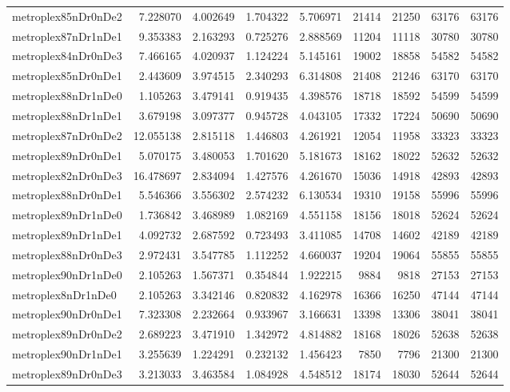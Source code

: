 \begin{longtable}{|l|r|r|r|r|r|r|r|r|}
metroplex85nDr0nDe2 & 7.228070 & 4.002649 & 1.704322 & 5.706971 & 21414 & 21250 & 63176 & 63176 \\
metroplex87nDr1nDe1 & 9.353383 & 2.163293 & 0.725276 & 2.888569 & 11204 & 11118 & 30780 & 30780 \\
metroplex84nDr0nDe3 & 7.466165 & 4.020937 & 1.124224 & 5.145161 & 19002 & 18858 & 54582 & 54582 \\
metroplex85nDr0nDe1 & 2.443609 & 3.974515 & 2.340293 & 6.314808 & 21408 & 21246 & 63170 & 63170 \\
metroplex88nDr1nDe0 & 1.105263 & 3.479141 & 0.919435 & 4.398576 & 18718 & 18592 & 54599 & 54599 \\
metroplex88nDr1nDe1 & 3.679198 & 3.097377 & 0.945728 & 4.043105 & 17332 & 17224 & 50690 & 50690 \\
metroplex87nDr0nDe2 & 12.055138 & 2.815118 & 1.446803 & 4.261921 & 12054 & 11958 & 33323 & 33323 \\
metroplex89nDr0nDe1 & 5.070175 & 3.480053 & 1.701620 & 5.181673 & 18162 & 18022 & 52632 & 52632 \\
metroplex82nDr0nDe3 & 16.478697 & 2.834094 & 1.427576 & 4.261670 & 15036 & 14918 & 42893 & 42893 \\
metroplex88nDr0nDe1 & 5.546366 & 3.556302 & 2.574232 & 6.130534 & 19310 & 19158 & 55996 & 55996 \\
metroplex89nDr1nDe0 & 1.736842 & 3.468989 & 1.082169 & 4.551158 & 18156 & 18018 & 52624 & 52624 \\
metroplex89nDr1nDe1 & 4.092732 & 2.687592 & 0.723493 & 3.411085 & 14708 & 14602 & 42189 & 42189 \\
metroplex88nDr0nDe3 & 2.972431 & 3.547785 & 1.112252 & 4.660037 & 19204 & 19064 & 55855 & 55855 \\
metroplex90nDr1nDe0 & 2.105263 & 1.567371 & 0.354844 & 1.922215 & 9884 & 9818 & 27153 & 27153 \\
metroplex8nDr1nDe0 & 2.105263 & 3.342146 & 0.820832 & 4.162978 & 16366 & 16250 & 47144 & 47144 \\
metroplex90nDr0nDe1 & 7.323308 & 2.232664 & 0.933967 & 3.166631 & 13398 & 13306 & 38041 & 38041 \\
metroplex89nDr0nDe2 & 2.689223 & 3.471910 & 1.342972 & 4.814882 & 18168 & 18026 & 52638 & 52638 \\
metroplex90nDr1nDe1 & 3.255639 & 1.224291 & 0.232132 & 1.456423 & 7850 & 7796 & 21300 & 21300 \\
metroplex89nDr0nDe3 & 3.213033 & 3.463584 & 1.084928 & 4.548512 & 18174 & 18030 & 52644 & 52644 \\

\end{longtable}
